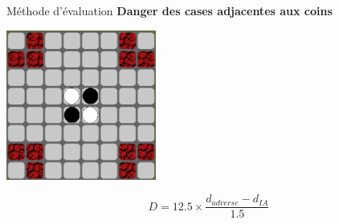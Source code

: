 \begin{frame}[t]{Méthode d'évaluation}
    \textbf{Danger des cases adjacentes aux coins}
    \hspace{0.2\textwidth}
    \begin{center}
        \includegraphics[width=0.37\textwidth]{img/danger_adj.png}
    \end{center}
    \hspace{0.5\textwidth}
    \[
        D = 12.5 \times \frac{d_{adverse} - d_{IA}}{1.5}
    \]
\end{frame}

